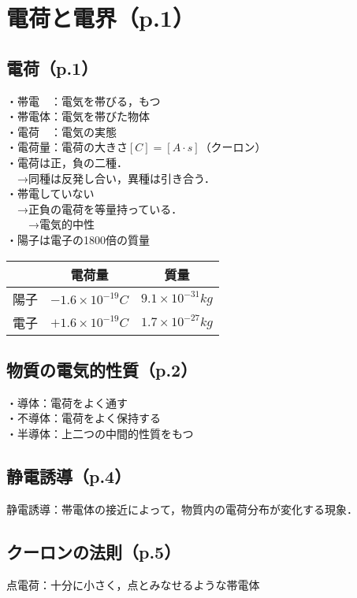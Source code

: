 \section{電荷と電界（p.1）}
\subsection{電荷（p.1）}
・帯電　：電気を帯びる，もつ\\
・帯電体：電気を帯びた物体\\
・電荷　：電気の実態\\
・電荷量：電荷の大きさ$[C]=[A \cdot s]$（クーロン）\\
・電荷は正，負の二種．\\
　→同種は反発し合い，異種は引き合う．\\
・帯電していない\\
　→正負の電荷を等量持っている．\\
　　→電気的中性\\
・陽子は電子の1800倍の質量\\
\begin{table}[htb]
  \begin{center}
    \begin{tabular}{|l|c|c|} \hline
      & 電荷量 & 質量 \\ \hline
      陽子 & $-1.6 \times 10^{-19}C$ & $9.1 \times 10^{-31}kg$\\
      電子 & $+1.6 \times 10^{-19}C$ & $1.7 \times 10^{-27}kg$\\ \hline
    \end{tabular}
  \end{center}
\end{table}

\subsection{物質の電気的性質（p.2）}
・導体：電荷をよく通す\\
・不導体：電荷をよく保持する\\
・半導体：上二つの中間的性質をもつ\\

\subsection{静電誘導（p.4）}
静電誘導：帯電体の接近によって，物質内の電荷分布が変化する現象．

\subsection{クーロンの法則（p.5）}
点電荷：十分に小さく，点とみなせるような帯電体\\

